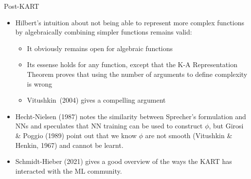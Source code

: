 \begin{frame}{Post-KART}

\begin{itemize}
\item Hilbert's intuition about not being able to represent more
  complex functions by algebraically combining simpler functions remains valid:
  \begin{itemize}
  \item It obviously remains open for algebraic functions
  \item Its essense holds for any function, except that the K-A
    Representation Theorem proves that using the number of arguments
    to define complexity is wrong
  \item Vitushkin~(2004) gives a compelling argument
  \end{itemize}
\vspace{0.5em}
\item Hecht-Nielsen (1987) notes the similarity between Sprecher's
  formulation and NNs and speculates that NN training can be used to
  construct $\phi$, but Girosi \& Poggio (1989) point out that we know
  $\phi$ are not smooth (Vitushkin \& Henkin, 1967) and cannot be
  learnt.
\vspace{0.5em}
\item Schmidt-Hieber (2021) gives a good overview of the ways the KART
  has interacted with the ML community.
  
\end{itemize}

\end{frame}
